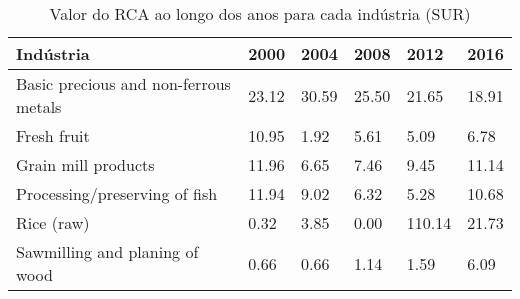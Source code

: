 \begin{table}
\centering
\caption{Valor do RCA ao longo dos anos para cada indústria (SUR)}
\label{tab:ex3-tempo-SUR}
\begin{tabular}{p{6cm}p{1.5cm}p{1.5cm}p{1.5cm}p{1.5cm}p{1.5cm}}
\toprule
                            Indústria &  2000 &  2004 &  2008 &   2012 &  2016 \\
\midrule
Basic precious and non-ferrous metals & 23.12 & 30.59 & 25.50 &  21.65 & 18.91 \\
                          Fresh fruit & 10.95 &  1.92 &  5.61 &   5.09 &  6.78 \\
                  Grain mill products & 11.96 &  6.65 &  7.46 &   9.45 & 11.14 \\
        Processing/preserving of fish & 11.94 &  9.02 &  6.32 &   5.28 & 10.68 \\
                           Rice (raw) &  0.32 &  3.85 &  0.00 & 110.14 & 21.73 \\
       Sawmilling and planing of wood &  0.66 &  0.66 &  1.14 &   1.59 &  6.09 \\
\bottomrule
\end{tabular}
\end{table}
